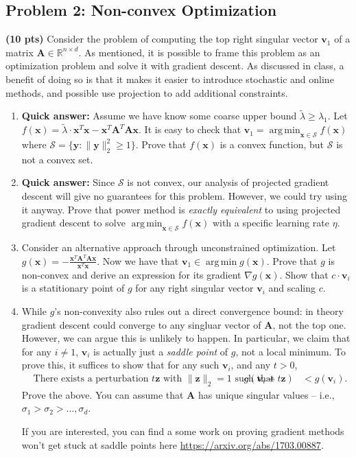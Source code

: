 \documentclass[10pt]{article}
\newcommand{\bv}[1]{\mathbf{#1}}
\newcommand{\R}{\mathbb{R}}
\DeclareMathOperator*{\argmin}{arg\,min}
\begin{document}
\subsection{Problem 2: Non-convex Optimization}
\textbf{(10 pts)} Consider the problem of computing the top right singular vector $\bv{v}_1$ of a matrix $\bv{A}\in \R^{n\times d}$. As mentioned, it is possible to frame this problem as an optimization problem and solve it with gradient descent. As discussed in class, a benefit of doing so is that it makes it easier to introduce stochastic and online methods, and possible use projection to add additional constraints. 
\begin{enumerate}
	\item \textbf{Quick answer:} Assume we have know some coarse upper bound $\tilde{\lambda}\geq \lambda_1$. Let $f(\bv{x}) = \tilde{\lambda}\cdot \bv{x}^T\bv{x} -\bv{x}^T\bv{A}^T\bv{A}\bv{x}$. It is easy to check that $\bv{v}_1 = \argmin_{\bv{x} \in \mathcal{S}} f(\bv{x})$ where $\mathcal{S} = \{\bv{y}: \|\bv{y}\|_2^2 \geq 1\}$. Prove that $f(\bv{x})$ is a convex function, but $\mathcal{S}$ is not a convex set. 
	\item \textbf{Quick answer:} Since $\mathcal{S}$ is not convex, our analysis of projected gradient descent will give no guarantees for this problem. However, we could try using it anyway. Prove that power method is \emph{exactly equivalent} to using projected gradient descent to solve $\argmin_{\bv{x} \in \mathcal{S}} f(\bv{x})$ with a specific learning rate $\eta$. 
	
	\item Consider an alternative approach through unconstrained optimization. Let $g(\bv{x}) = -\frac{\bv{x}^T\bv{A}^T\bv{A}\bv{x}}{\bv{x}^T\bv{x}}$. Now we have that $\bv{v}_1 \in \argmin g(\bv{x})$. Prove that $g$ is non-convex and derive an expression for its gradient $\nabla g(\bv{x})$. Show that $c\cdot \bv{v}_i$ is a statitionary point of $g$ for any right singular vector $\bv{v}_i$ and scaling $c$. 
	
	\item While $g$'s non-convexity also rules out a direct convergence bound: in theory gradient descent could converge to any singluar vector of $\bv{A}$, not the top one. However, we can argue this is unlikely to happen. In particular, we claim that for any $i\neq 1$,  $\bv{v}_i$ is actually just a \emph{saddle point} of $g$, not a local minimum. To prove this, it suffices to show that for any such $\bv{v}_i$, and any $t > 0$,
	\begin{align*}
		&\text{There exists a perturbation $t\bv{z}$ with $\|\bv{z}\|_2 = 1$ such that} & g(\bv{v}_i + {t}\bv{z})  &< g(\bv{v}_i).
	\end{align*}
	Prove the above. You can assume that $\bv{A}$ has unique singular values -- i.e., $\sigma_1 > \sigma_2 > \ldots, \sigma_d$. 
	
	If you are interested, you can find a some work on proving gradient methods won't get stuck at saddle points here \url{https://arxiv.org/abs/1703.00887}.
\end{enumerate}
\end{document}
